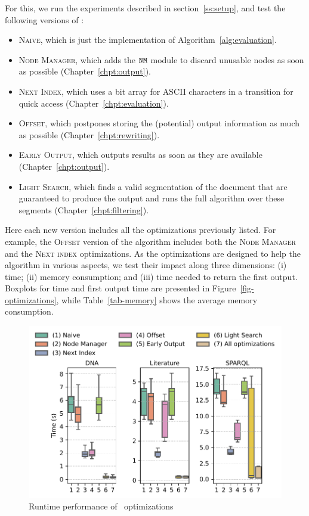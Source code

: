 For this, we run the experiments described in section~\ref{ss:setup}, and test
the following versions of \rematch:
\begin{itemize}
	\item \textsc{Naive}, which is just the implementation of
	Algorithm~\ref{alg:evaluation}.
	\item \textsc{Node Manager}, which adds the $\mathtt{NM}$ module to discard unusable
	nodes as soon as possible (Chapter~\ref{chpt:output}).
	\item \textsc{Next Index}, which uses a bit array for ASCII characters in a
	transition for quick access (Chapter~\ref{chpt:evaluation}).
	\item \textsc{Offset}, which postpones storing the (potential) output
	information as much as possible (Chapter~\ref{chpt:rewriting}).
	\item \textsc{Early Output}, which outputs results as soon as they are
	available (Chapter~\ref{chpt:output}).
	\item \textsc{Light Search}, which finds a valid segmentation of the
	document that are guaranteed to produce the output and runs the full
	algorithm over these segments (Chapter~\ref{chpt:filtering}).
\end{itemize}

Here each new version includes all the optimizations  previously listed. For
example, the \textsc{Offset} version of the algorithm includes both the
\textsc{Node Manager} and the \textsc{Next index} optimizations. As the
optimizations are designed to help the algorithm in various aspects, we test
their impact along three dimensions: (i) time; (ii) memory consumption; and
(iii) time needed to return the first output. Boxplots for time and first output
time are presented in Figure~\ref{fig-optimizations}, while
Table~\ref{tab-memory} shows the average memory consumption.


\begin{figure}[t]
	\centering
	\centering
	\includegraphics[width=.8\textwidth]{figures/versions-time.pdf}
	\caption{Runtime performance of \rematch\ optimizations}
	\label{fig:opt-time}
\end{figure}

